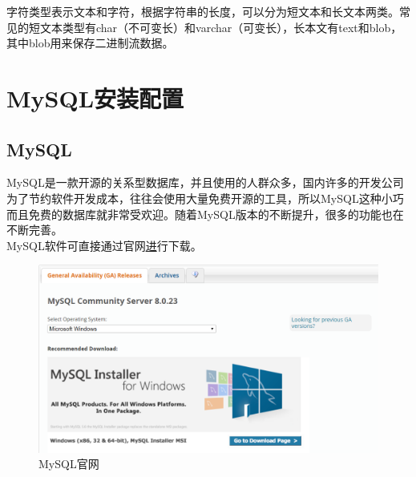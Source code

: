 \documentclass[12pt, openany, oneside]{book}
\begin{document}
字符类型表示文本和字符，根据字符串的长度，可以分为短文本和长文本两类。常见的短文本类型有char（不可变长）和varchar（可变长），长本文有text和blob，其中blob用来保存二进制流数据。

\begin{table}[H]
	\centering
	\caption{字符型}
\end{table}

\newpage

\chapter{MySQL安装配置}

\section{MySQL}

MySQL是一款开源的关系型数据库，并且使用的人群众多，国内许多的开发公司为了节约软件开发成本，往往会使用大量免费开源的工具，所以MySQL这种小巧而且免费的数据库就非常受欢迎。随着MySQL版本的不断提升，很多的功能也在不断完善。\\

MySQL软件可直接通过官网\href{https://dev.mysql.com/downloads/mysql/8.0.html}进行下载。\\

\begin{figure}[H]
	\centering
	\includegraphics[scale=0.5]{img/C2/1.png}
	\caption{MySQL官网}
\end{figure}
\end{document}
